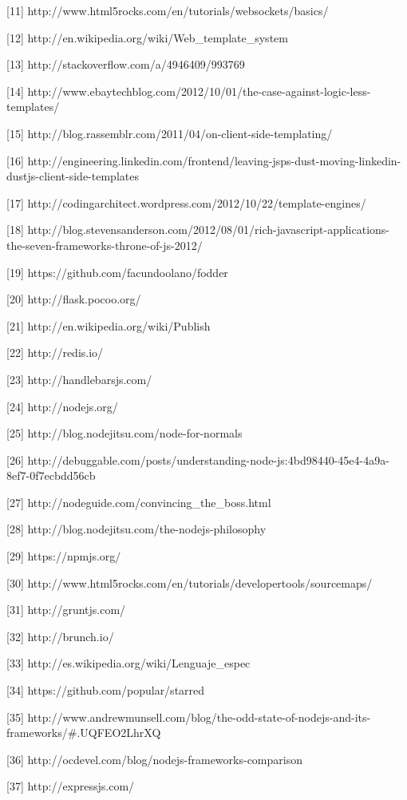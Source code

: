 \documentclass[doc,helv,longtable]{article}
\begin{document}
[11] http://www.html5rocks.com/en/tutorials/websockets/basics/

[12] http://en.wikipedia.org/wiki/Web_template_system

[13] http://stackoverflow.com/a/4946409/993769

[14] http://www.ebaytechblog.com/2012/10/01/the-case-against-logic-less-templates/

[15] http://blog.rassemblr.com/2011/04/on-client-side-templating/

[16] http://engineering.linkedin.com/frontend/leaving-jsps-dust-moving-linkedin-dustjs-client-side-templates

[17] http://codingarchitect.wordpress.com/2012/10/22/template-engines/

[18] http://blog.stevensanderson.com/2012/08/01/rich-javascript-applications-the-seven-frameworks-throne-of-js-2012/

[19] https://github.com/facundoolano/fodder

[20] http://flask.pocoo.org/

[21] http://en.wikipedia.org/wiki/Publish%

[22] http://redis.io/

[23] http://handlebarsjs.com/

[24] http://nodejs.org/

[25] http://blog.nodejitsu.com/node-for-normals

[26] http://debuggable.com/posts/understanding-node-js:4bd98440-45e4-4a9a-8ef7-0f7ecbdd56cb

[27] http://nodeguide.com/convincing_the_boss.html

[28] http://blog.nodejitsu.com/the-nodejs-philosophy

[29] https://npmjs.org/

[30] http://www.html5rocks.com/en/tutorials/developertools/sourcemaps/

[31] http://gruntjs.com/

[32] http://brunch.io/

[33] http://es.wikipedia.org/wiki/Lenguaje_espec%

[34] https://github.com/popular/starred

[35] http://www.andrewmunsell.com/blog/the-odd-state-of-nodejs-and-its-frameworks/#.UQFEO2LhrXQ

[36] http://ocdevel.com/blog/nodejs-frameworks-comparison

[37] http://expressjs.com/
\end{document}
